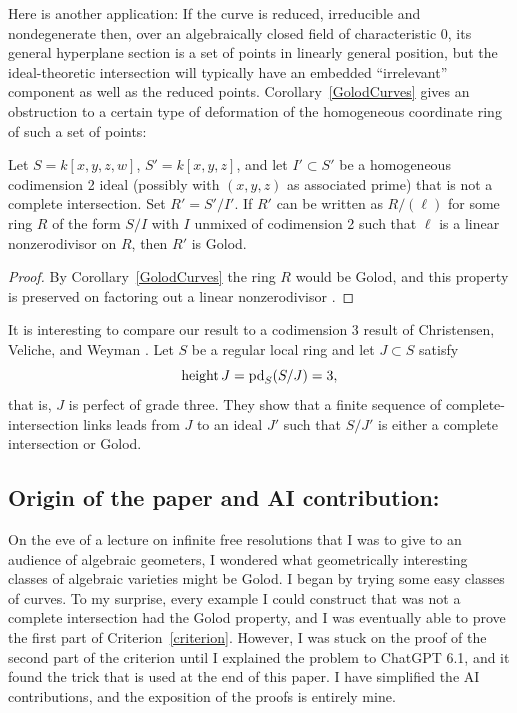 \documentclass[11pt]{amsart}
\begin{document}
Here is another application: 
If the curve is reduced, irreducible and nondegenerate then, 
over an algebraically closed field of characteristic 0, its general hyperplane section is a set of points in linearly general position, but the ideal-theoretic  intersection will typically have an embedded ``irrelevant'' component as well as the reduced points. Corollary~\ref{GolodCurves} gives an obstruction to a certain type of deformation of the homogeneous coordinate ring of such a set of points:

\begin{corollary}
Let $S = k[x,y,z,w]$, $S' = k[x,y,z]$,  and  let $I' \subset S'$ be a homogeneous codimension 2 ideal (possibly with $(x,y,z)$ as associated prime) that is not a complete intersection. Set $R' = S'/I'$. If $R'$ can be written as $R/(\ell)$ for
some ring $R$ of the form $S/I$ with $I$ unmixed of codimension 2
such that $\ell$ is a linear nonzerodivisor on $R$,  then $R'$ is Golod.
\end{corollary}
\begin{proof}
By Corollary~\ref{GolodCurves} the ring $R$ would be Golod, and this property is preserved on factoring out a linear nonzerodivisor \cite[Proposition~5.2.4(2),(3), p.~46]{AvramovInfinite}.
\end{proof}

It is interesting to compare our result to a codimension 3 result of
Christensen, Veliche, and Weyman
\cite[Theorem~1.2]{CVW}. Let $S$ be a regular local ring and let
$J\subset S$ satisfy
\[
\operatorname{height} J=\operatorname{pd}_S(S/J)=3,
\]
that is, $J$ is perfect of grade three. They show that a finite sequence
of complete-intersection links leads from $J$ to an ideal $J'$ such that
$S/J'$ is either a complete intersection or Golod. 

\subsection{Origin of the paper and AI contribution:}\label{sec:ack}

On the eve of a lecture on infinite free resolutions  that I was to give
 to an audience of algebraic geometers, I wondered what geometrically interesting classes of algebraic varieties might be Golod. I began by
 trying some easy classes of curves. To my surprise, every example I could construct that was not a complete
 intersection had the Golod property, and I was eventually able to prove the first part of Criterion~\ref{criterion}. However, I was stuck on the proof of the second part of the criterion until I explained
 the problem to ChatGPT 6.1, and it found the trick that is used at the end of this paper. I have simplified the AI contributions, and the exposition of the proofs is entirely mine.
 
\end{document}
